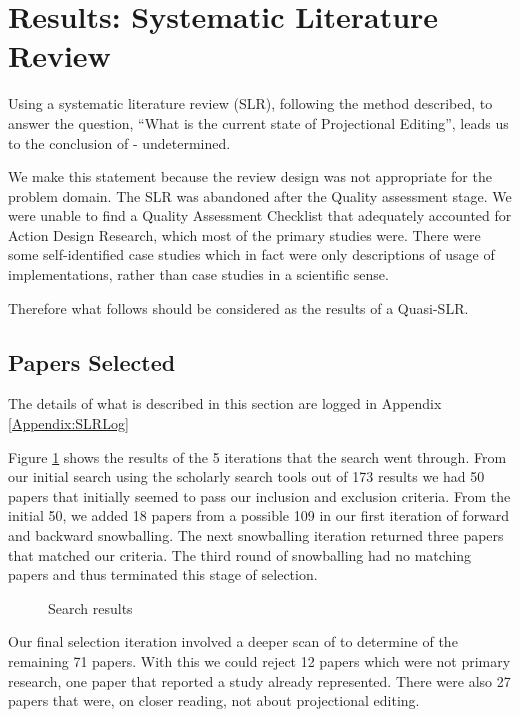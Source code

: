 \section{Results: Systematic Literature Review}\label{section:Results_SLR}

Using a systematic literature review (SLR), following the method described, to answer the question, ``What is the current state of Projectional Editing'', leads us to the conclusion of - undetermined.

We make this statement because the review design was not appropriate for the problem domain.
The SLR was abandoned after the Quality assessment stage.
We were unable to find a Quality Assessment Checklist that adequately accounted for Action Design Research, which most of the primary studies were.
There were some self-identified case studies which in fact were only descriptions of usage of implementations, rather than case studies in a scientific sense.

Therefore what follows should be considered as the results of a Quasi-SLR.

\subsection{Papers Selected}
The details of what is described in this section are logged in Appendix \ref{Appendix:SLRLog}

Figure \ref{fig:search_results} shows the results of the 5 iterations that the search went through.
From our initial search using the scholarly search tools out of 173 results we had 50 papers that initially seemed to pass our inclusion and exclusion criteria.
From the initial 50, we added 18 papers from a possible 109 in our first iteration of forward and backward snowballing.
The next snowballing iteration returned three papers that matched our criteria.
The third round of snowballing had no matching papers and thus terminated this stage of selection.

\begin{figure}[htbp]
    \centering
    \caption{Search results}
    \label{fig:search_results}
\end{figure}


Our final selection iteration involved a deeper scan of to determine of the remaining 71 papers.
With this we could reject 12 papers which were not primary research, one paper that reported a study already represented.
There were also 27 papers that were, on closer reading, not about projectional editing.

